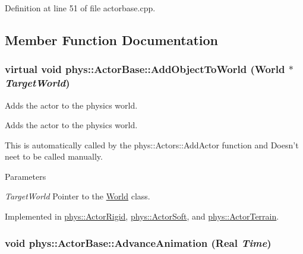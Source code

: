 Definition at line 51 of file actorbase.cpp.



\subsection{Member Function Documentation}
\hypertarget{classphys_1_1ActorBase_a3d28e4c4a33f50210101695cb33ded3b}{
\subsubsection[{AddObjectToWorld}]{\setlength{\rightskip}{0pt plus 5cm}virtual void phys::ActorBase::AddObjectToWorld ({\bf World} $\ast$ {\em TargetWorld})}}
\label{d8/d0f/classphys_1_1ActorBase_a3d28e4c4a33f50210101695cb33ded3b}


Adds the actor to the physics world. 

Adds the actor to the physics world. \par
 This is automatically called by the phys::Actors::AddActor function and Doesn't neet to be called manually. 
\begin{DoxyParams}{Parameters}
\item[{\em TargetWorld}]Pointer to the \hyperlink{classphys_1_1World}{World} class. \end{DoxyParams}


Implemented in \hyperlink{classphys_1_1ActorRigid_acaf29ca7058b39185dd09a5059200e91}{phys::ActorRigid}, \hyperlink{classphys_1_1ActorSoft_a5f97915d1cda0d048853718714a26d93}{phys::ActorSoft}, and \hyperlink{classphys_1_1ActorTerrain_a890ee6f67fda30381bce9c949ae36566}{phys::ActorTerrain}.

\hypertarget{classphys_1_1ActorBase_a37d5a8a3ae4ca3c6e7d14706096faa85}{
\subsubsection[{AdvanceAnimation}]{\setlength{\rightskip}{0pt plus 5cm}void phys::ActorBase::AdvanceAnimation ({\bf Real} {\em Time})}}
\label{d8/d0f/classphys_1_1ActorBase_a37d5a8a3ae4ca3c6e7d14706096faa85}


